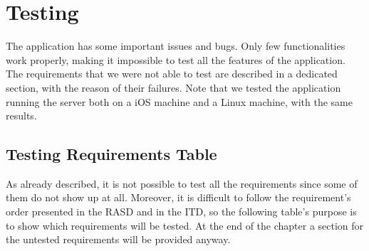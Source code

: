 \documentclass[../ATD.tex]{subfiles}
\begin{document}
    \chapter{Testing}\label{ch:testing}
    The application has some important issues and bugs.
    Only few functionalities work properly, making it impossible to test all the features of the application.
    The requirements that we were not able to test are described in a dedicated section, with the reason of their failures.
    Note that we tested the application running the server both on a iOS machine and a Linux machine, with the same results.

    \section{Testing Requirements Table}\label{sec:testing-requirements-table}
    As already described, it is not possible to test all the requirements since some of them do not show up at all.
    Moreover, it is difficult to follow the requirement's order presented in the RASD and in the ITD, so the following table's purpose is to show which requirements will be tested.
    At the end of the chapter a section for the untested requirements will be provided anyway.
\end{document}
